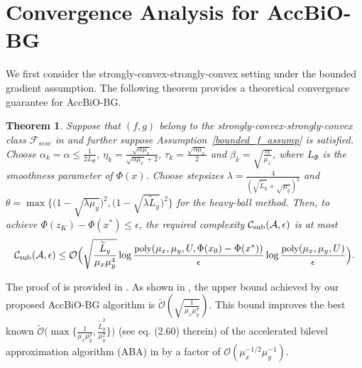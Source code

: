 \documentclass{osudissert96}
\DeclareMathOperator*{\argmin}{arg\,min}
\newtheorem{theorem}{Theorem}
\begin{document}
\begin{algorithm}[t]
\begin{algorithmic}[1]
		\ENDFOR
	\end{algorithmic}
	\end{algorithm}

\vspace{-0.1cm}	
\section{Convergence Analysis for AccBiO-BG}	
We first consider the strongly-convex-strongly-convex setting under the bounded gradient assumption. The following theorem provides a theoretical convergence guarantee for AccBiO-BG.
\begin{theorem}\label{upper_srsr} 
Suppose that $(f,g)$ belong to the strongly-convex-strongly-convex class $\mathcal{F}_{scsc}$ in  and further suppose Assumption~\ref{bounded_f_assump} is satisfied. 
Choose $\alpha_k=\alpha\leq \frac{1}{2L_\Phi}$, $\eta_k=\frac{\sqrt{\alpha\mu_x}}{\sqrt{\alpha\mu_x}+2}$, $\tau_k=\frac{\sqrt{\alpha\mu_x}}{2}$ and $\beta_k=\sqrt{\frac{\alpha}{\mu_x}}$, where $L_\Phi$ is the smoothness parameter of $\Phi(x)$. Choose stepsizes {\small $\lambda=\frac{4}{(\sqrt{\widetilde L_y}+\sqrt{\mu_y})^2}$} and {\small $\theta=\max\big\{\big(1-\sqrt{\lambda\mu_y}\big)^2,\big(1-\sqrt{\lambda\widetilde L_y}\big)^2\big\}$} for the heavy-ball method.  
Then, to achieve $\Phi(z_K) - \Phi(x^*) \leq \epsilon$, the required complexity $\mathcal{C}_{\text{\normalfont sub}}(\mathcal{A},\epsilon)$ is at most 
\begin{align*}
\mathcal{C}_{\text{\normalfont sub}}(\mathcal{A},\epsilon)\leq  \mathcal{O}\Big(\sqrt{\frac{\widetilde L_y}{\mu_x\mu_y^4}}\log\frac{\mbox{\normalfont\small poly}(\mu_x,\mu_y,U,\Phi(x_{0})-\Phi(x^*))}{\epsilon}  \log \frac{\mbox{\normalfont \small poly}(\mu_x,\mu_y,U)}{\epsilon} \Big).
\end{align*}
\end{theorem}	
The proof of  is provided in . As shown in , the upper bound achieved by our proposed AccBiO-BG algorithm is {\small$\mathcal{\widetilde O}(\sqrt{\frac{1}{\mu_x\mu_y^4}})$}. This bound improves the best known $\mathcal{\widetilde O}\big(\max\big\{\frac{1}{\mu_x\mu_y^3},\frac{\widetilde L^2_y}{\mu_y^2}\big\}\big)$ (see eq. (2.60) therein)  of the accelerated bilevel approximation algorithm (ABA) in  \cite{ghadimi2018approximation} by a factor of $\mathcal{O}(\mu_x^{-1/2}\mu_y^{-1})$. 
\end{document}
